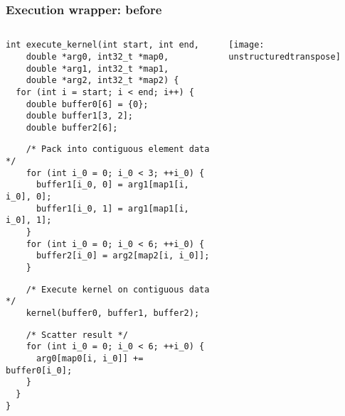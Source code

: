 \documentclass[presentation,aspectratio=43,10pt]{beamer}
\begin{document}
\begin{frame}[fragile]
  \frametitle{Execution wrapper: before}
  \begin{columns}
    \begin{column}{0.5\textwidth}
\begin{verbatim}
int execute_kernel(int start, int end,
    double *arg0, int32_t *map0,
    double *arg1, int32_t *map1,
    double *arg2, int32_t *map2) {
  for (int i = start; i < end; i++) {
    double buffer0[6] = {0};
    double buffer1[3, 2];
    double buffer2[6];
\end{verbatim}
      \vspace{-1.2\baselineskip}
\begin{verbatim}
    /* Pack into contiguous element data */
    for (int i_0 = 0; i_0 < 3; ++i_0) {
      buffer1[i_0, 0] = arg1[map1[i, i_0], 0];
      buffer1[i_0, 1] = arg1[map1[i, i_0], 1];
    }
    for (int i_0 = 0; i_0 < 6; ++i_0) {
      buffer2[i_0] = arg2[map2[i, i_0]];
    }
\end{verbatim}
      \vspace{-2.4\baselineskip}
\begin{verbatim}
    /* Execute kernel on contiguous data */
    kernel(buffer0, buffer1, buffer2);
\end{verbatim}
      \vspace{-2.4\baselineskip}
\begin{verbatim}
    /* Scatter result */
    for (int i_0 = 0; i_0 < 6; ++i_0) {
      arg0[map0[i, i_0]] += buffer0[i_0];
    }
  }
}
\end{verbatim}
    \end{column}
    \begin{column}{0.5\textwidth}
      \begin{center}
        \texttt{[image: unstructuredtranspose]}
      \end{center}
    \end{column}
  \end{columns}
\end{frame}
\end{document}
